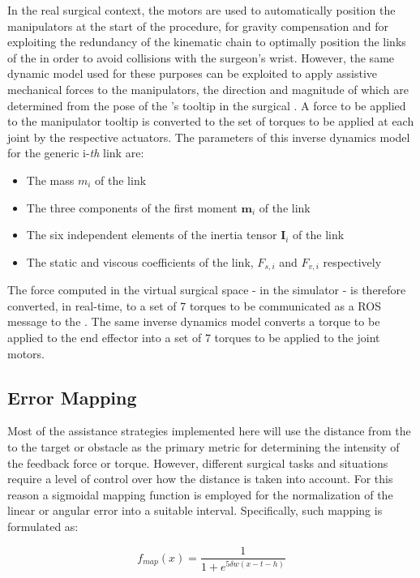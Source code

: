 \documentclass[../main.tex]{subfiles}
\begin{document}
In the real surgical context, the motors are used to automatically position the manipulators at the start of the procedure, for gravity compensation and for exploiting the redundancy of the kinematic chain to optimally position the links of the \mtm in order to avoid collisions with the surgeon's wrist. However, the same dynamic model used for these purposes can be exploited to apply assistive mechanical forces to the manipulators, the direction and magnitude of which are determined from the pose of the \psms's tooltip in the surgical \rf. A force to be applied to the manipulator tooltip is converted to the set of torques to be applied at each joint by the respective actuators. The parameters of this inverse dynamics model \cite{Fontanelli2017} for the generic i-\textit{th} link are:
\begin{itemize}
  \item The mass $m_i$ of the link
  \item The three components of the first moment $\textbf{m}_i$ of the link
  \item The six independent elements of the inertia tensor $\textbf{I}_i$ of the link
  \item The static and viscous coefficients of the link, $F_{s,i}$ and $F_{v,i}$ respectively
\end{itemize}

The \vf force computed in the virtual surgical space - in the simulator - is therefore converted, in real-time, to a set of 7 torques to be communicated as a ROS message to the \mtms. 
The same inverse dynamics model converts a torque to be applied to the end effector into a set of 7 torques to be applied to the joint motors. 

\subsection{Error Mapping}
Most of the assistance strategies implemented here will use the distance from the \psm to the target or obstacle as the primary metric for determining the intensity of the feedback force or torque. However, different surgical tasks and situations require a level of control over how the distance is taken into account. For this reason a sigmoidal mapping function is employed for the normalization of the linear or angular error into a suitable interval. Specifically, such mapping is formulated as:

\begin{equation}
  f_{map}(x) = \frac{1}{1+e^{5\delta w(x-t-h)}}
  \label{eq:sigmoidalmap}
\end{equation}
\end{document}
